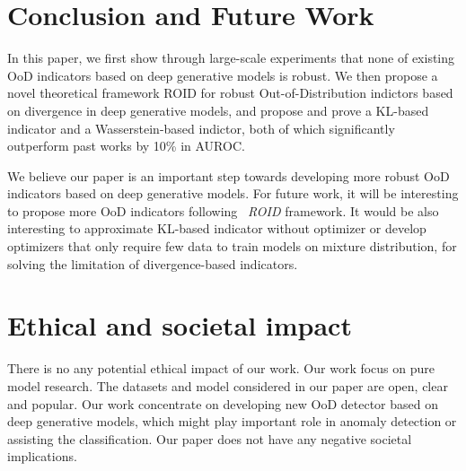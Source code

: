 \documentclass[letterpaper]{article} %
\newcommand{\ROID}{\textit{ROID}}
\begin{document}
\section{Conclusion and Future Work}
In this paper, we first show through large-scale experiments that none of existing OoD indicators based on deep generative models is robust. We then propose a novel theoretical framework ROID for robust Out-of-Distribution indictors based on divergence in deep generative models, and propose and prove a KL-based indicator and a Wasserstein-based indictor, both of which significantly outperform past works by 10\% in AUROC.


 We believe our paper is an important step towards developing more robust OoD indicators based on deep generative models. For future work,  it will be interesting to propose more OoD indicators following ~\ROID{} framework. It would be also interesting to approximate KL-based indicator without optimizer or develop optimizers that only require few data to train models on mixture distribution, for solving the limitation of divergence-based indicators. 
 
 
\newpage
\section{Ethical and societal impact}
There is no any potential ethical impact of our work. Our work focus on pure model research. The datasets and model considered in our paper are open, clear and popular. Our work concentrate on developing new OoD detector based on deep generative models, which might play important role in anomaly detection or assisting the classification. Our paper does not have any negative societal implications.  

\end{document}
